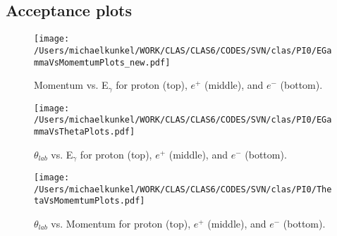 \documentclass[11pt,a4paper]{article}
\newlength{\figwidth}
\newlength{\hfigheight}
\begin{document}
\subsection{Acceptance plots} \label{sec:AppenII}
\begin{figure}[h!]\begin{center}
		\texttt{[image: /Users/michaelkunkel/WORK/CLAS/CLAS6/CODES/SVN/clas/PI0/EGammaVsMomemtumPlots\_new.pdf]}
		\caption[Mometum depdence on Egamma]{\label{fig:syserrLorentzI}Momentum vs. E$_\gamma$ for proton (top), $e^+$ (middle), and $e^-$ (bottom).}
\end{center}\end{figure}
\begin{figure}[h!]\begin{center}
		\texttt{[image: /Users/michaelkunkel/WORK/CLAS/CLAS6/CODES/SVN/clas/PI0/EGammaVsThetaPlots.pdf]}
		\caption[Mometum depdence on Egamma]{\label{fig:syserrLorentzII}$\theta_{lab}$ vs. E$_\gamma$ for proton (top), $e^+$ (middle), and $e^-$ (bottom).}
\end{center}\end{figure}
\begin{figure}[h!]\begin{center}
		\texttt{[image: /Users/michaelkunkel/WORK/CLAS/CLAS6/CODES/SVN/clas/PI0/ThetaVsMomemtumPlots.pdf]}
		\caption[Mometum depdence on Egamma]{\label{fig:syserrLorentzIII}$\theta_{lab}$ vs. Momentum for proton (top), $e^+$ (middle), and $e^-$ (bottom).}
\end{center}\end{figure}
\end{document}
